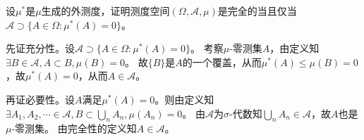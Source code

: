 \documentclass{ctexart}
\newif\ifpreface
\begin{document}
\large
\setlength{\baselineskip}{1.2em}
\ifpreface

\else
\maketitle
\fi
\newtheorem*{remark}{remark}

\begin{problem}\label{pro:1.4.21}
  设\(\mu^* \)是\(\mu \)生成的外测度，证明测度空间\((\Omega,\mathcal{A},\mu)\)是完全的当且仅当\(\mathcal{A} \supset \{A \in \Omega:\mu^*(A)=0\} \)。
\end{problem}
\begin{solution}
  先证充分性。设\(\mathcal{A} \supset \{A \in \Omega:\mu^*(A)=0\}\)。
  考察\(\mu \)-零测集\(A \)，由定义知\(\exists B \in \mathcal{A},A \subset B,\mu(B)=0 \)。
  故\(\{B\} \)是\(A \)的一个覆盖，从而\(\mu^*(A) \leq \mu(B)=0 \)，故\(\mu^*(A)=0 \)，从而\(A \in \mathcal{A} \)。

  再证必要性。设\(A \)满足\(\mu^*(A)=0 \)。则由定义知\(\exists A_1,A_2,\cdots \in \mathcal{A},B \subset \bigcup_{n}A_n,\mu(A_n)=0 \)。
  由\(\mathcal{A} \)为\(\sigma \)-代数知\(\bigcup_{n}A_n \in \mathcal{A} \)，故\(A \)也是\(\mu \)-零测集。
  由完全性的定义知\(A \in \mathcal{A} \)。
\end{solution}
\end{document}

